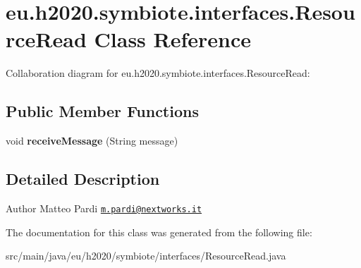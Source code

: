 \hypertarget{classeu_1_1h2020_1_1symbiote_1_1interfaces_1_1ResourceRead}{}\section{eu.\+h2020.\+symbiote.\+interfaces.\+Resource\+Read Class Reference}
\label{classeu_1_1h2020_1_1symbiote_1_1interfaces_1_1ResourceRead}


Collaboration diagram for eu.\+h2020.\+symbiote.\+interfaces.\+Resource\+Read\+:
\subsection*{Public Member Functions}
\begin{DoxyCompactItemize}
\item 
\mbox{\label{classeu_1_1h2020_1_1symbiote_1_1interfaces_1_1ResourceRead_a97ccd8fcb2933a696868cb375e03163c}} 
void {\bfseries receive\+Message} (String message)
\end{DoxyCompactItemize}


\subsection{Detailed Description}
\begin{DoxyAuthor}{Author}
Matteo Pardi \href{mailto:m.pardi@nextworks.it}{\tt m.\+pardi@nextworks.\+it} 
\end{DoxyAuthor}


The documentation for this class was generated from the following file\+:\begin{DoxyCompactItemize}
\item 
src/main/java/eu/h2020/symbiote/interfaces/Resource\+Read.\+java\end{DoxyCompactItemize}
